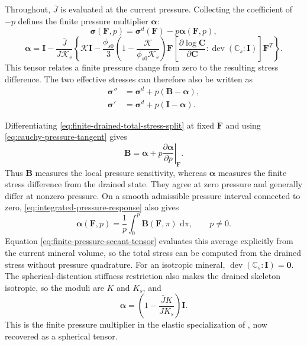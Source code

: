 \documentclass[11pt]{article}
\renewcommand{\boldsymbol}[1]{\symbf{#1}}
\newcommand{\dev}{\operatorname{dev}}
\newcommand{\dd}{\,\mathrm d}
\newcommand{\pder}[2]{\frac{\partial #1}{\partial #2}}
\begin{document}
Throughout, \(\bar J\) is evaluated at the current pressure.
Collecting the coefficient of \(-p\) defines the finite pressure
multiplier \(\boldsymbol{\alpha}\):
\begin{equation}
 \mathbf\sigma(\mathbf F,p)
 =\mathbf\sigma^d(\mathbf F)-p\boldsymbol{\alpha}(\mathbf F,p),
 \label{eq:finite-drained-total-stress-split}
\end{equation}
\begin{equation}
 \boldsymbol{\alpha}
 =\mathbf I-\frac{\bar J}{J\mathcal{K}_s}
 \left\{\mathcal{K}\mathbf I-\frac{\phi_{s0}}3\left(1-\frac{\mathcal{K}}{\phi_{s0}\mathcal{K}_s}\right)\mathbf F
 \left[\pder{\log\mathbf C}{\mathbf C}:
                \dev(\mathbb{C}_s:\mathbf I)\right]\mathbf F^T\right\}.
 \label{eq:finite-pressure-secant-tensor}
\end{equation}
This tensor relates a finite pressure change from zero to the resulting
stress difference. The two
effective stresses can therefore also be written as
\begin{align}
 \mathbf\sigma''&=\mathbf\sigma^d
                   +p(\mathbf B-\boldsymbol{\alpha}),
 \label{eq:double-prime-drained-finite-pressure-split}\\
 \mathbf\sigma'&=\mathbf\sigma^d
                   +p(\mathbf I-\boldsymbol{\alpha}).
 \label{eq:single-prime-drained-finite-pressure-split}
\end{align}

Differentiating \eqref{eq:finite-drained-total-stress-split} at fixed
\(\mathbf F\) and using \eqref{eq:cauchy-pressure-tangent} gives
\begin{equation}
 \mathbf B=\boldsymbol{\alpha}
      +p\left.\pder{\boldsymbol{\alpha}}p\right|_{\mathbf F}.
 \label{eq:biot-tangent-secant-relation}
\end{equation}
Thus \(\mathbf B\) measures the local pressure sensitivity, whereas
\(\boldsymbol{\alpha}\) measures the finite stress difference from
the drained state. They agree at zero pressure and generally differ at
nonzero pressure. On a smooth admissible pressure interval connected to
zero, \eqref{eq:integrated-pressure-response} also gives
\begin{equation}
 \boldsymbol{\alpha}(\mathbf F,p)
 =\frac1p\int_0^p\mathbf B(\mathbf F,\pi)\,\dd\pi,
 \qquad p\ne0.
 \label{eq:finite-pressure-secant-average}
\end{equation}
Equation \eqref{eq:finite-pressure-secant-tensor} evaluates this average
explicitly from the current mineral volume, so the total stress can be
computed from the drained stress without pressure quadrature. For an
isotropic mineral, \(\dev(\mathbb{C}_s:\mathbf I)=\mathbf0\).
The spherical-distention stiffness restriction also makes the drained
skeleton isotropic, so the moduli are \(K\) and \(K_s\), and
\begin{equation}
 \boldsymbol{\alpha}
 =\left(1-\frac{\bar J K}{J K_s}\right)\mathbf I.
 \label{eq:isotropic-finite-pressure-multiplier}
\end{equation}
This is the finite pressure multiplier in the elastic specialization of
\citet{foster2026poroplastic}, now recovered as a spherical tensor.
\end{document}

